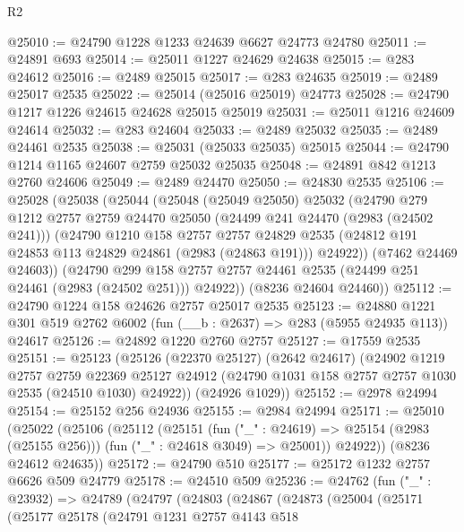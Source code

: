 \begin{lexlean}{R2}
\begin{coremodule}
@25010 := @24790 @1228 @1233 @24639 @6627 @24773 @24780
@25011 := @24891 @693
@25014 := @25011 @1227 @24629 @24638
@25015 := @283 @24612
@25016 := @2489 @25015
@25017 := @283 @24635
@25019 := @2489 @25017 @2535
@25022 := @25014 (@25016 @25019) @24773
@25028 := @24790 @1217 @1226 @24615 @24628 @25015 @25019
@25031 := @25011 @1216 @24609 @24614
@25032 := @283 @24604
@25033 := @2489 @25032
@25035 := @2489 @24461 @2535
@25038 := @25031 (@25033 @25035) @25015
@25044 := @24790 @1214 @1165 @24607 @2759 @25032 @25035
@25048 := @24891 @842 @1213 @2760 @24606
@25049 := @2489 @24470
@25050 := @24830 @2535
@25106 := @25028
    (@25038
      (@25044
        (@25048
          (@25049 @25050)
          @25032
          (@24790
            @279
            @1212
            @2757
            @2759
            @24470
            @25050
            (@24499 @241 @24470 (@2983 (@24502 @241)))
            (@24790
              @1210
              @158
              @2757
              @2757
              @24829
              @2535
              (@24812 @191 @24853 @113 @24829 @24861 (@2983 (@24863 @191)))
              @24922))
          (@7462 @24469 @24603))
        (@24790
          @299
          @158
          @2757
          @2757
          @24461
          @2535
          (@24499 @251 @24461 (@2983 (@24502 @251)))
          @24922))
      (@8236 @24604 @24460))
@25112 := @24790 @1224 @158 @24626 @2757 @25017 @2535
@25123 := @24880 @1221 @301 @519 @2762 @6002 (fun (__b : @2637) => @283 (@5955 @24935 @113)) @24617
@25126 := @24892 @1220 @2760 @2757
@25127 := @17559 @2535
@25151 := @25123
    (@25126
      (@22370 @25127)
      (@2642 @24617)
      (@24902
        @1219
        @2757
        @2759
        @22369
        @25127
        @24912
        (@24790 @1031 @158 @2757 @2757 @1030 @2535 (@24510 @1030) @24922))
      (@24926 @1029))
@25152 := @2978 @24994
@25154 := @25152 @256 @24936
@25155 := @2984 @24994
@25171 := @25010
    (@25022
      (@25106
        (@25112
          (@25151
            (fun ("_" : @24619) => @25154 (@2983 (@25155 @256)))
            (fun ("_" : @24618 @3049) => @25001))
          @24922))
      (@8236 @24612 @24635))
@25172 := @24790 @510
@25177 := @25172 @1232 @2757 @6626 @509 @24779
@25178 := @24510 @509
@25236 := @24762
    (fun ("_" : @23932) =>
    @24789
      (@24797
        (@24803
          (@24867
            (@24873
              (@25004
                (@25171
                  (@25177
                    @25178
                    (@24791
                      @1231
                      @2757
                      @4143
                      @518

\end{coremodule}
\end{lexlean}
